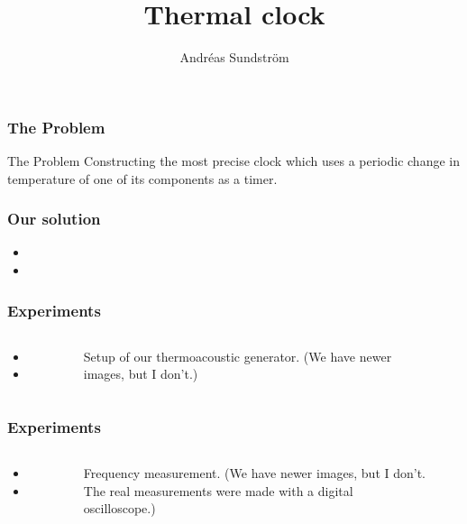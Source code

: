 \documentclass{beamer}
\title[Thermal clock]{Thermal clock} %
\author[]{Andréas Sundström}
\date{\vspace{-0.25cm}}
\institute[Chalmers]{\RBox{\large Chalmers University of Technology}}
\begin{document}

\begin{frame}[plain]

\linethickness{0.075mm}

  \titlepage
\end{frame}


\begin{frame}
\frametitle{The Problem}
 \begin{block}{\centering The Problem}\centering
Constructing the most precise clock which uses a periodic change in
temperature of one of its components as a timer. 
 \end{block}
\end{frame}

\begin{frame}
 \frametitle{Our solution}
 \begin{itemize}
  \item 
  \item 
 \end{itemize}
\end{frame}


\begin{frame}
 \frametitle{Experiments}
 \begin{columns}[c]
 \begin{itemize}
  \item 
  \item
 \end{itemize}
\begin{figure}
\caption{Setup of our thermoacoustic generator. (We have newer images,
but I don't.)}
\end{figure}
\end{columns}
\end{frame}


\begin{frame}
 \frametitle{Experiments}
 \begin{columns}[c]
 \begin{itemize}
  \item 
  \item 
 \end{itemize}
\begin{figure}
\caption{Frequency measurement. (We have newer images,
but I don't. The real measurements were made with a digital oscilloscope.)}
\end{figure}
\end{columns}
\end{frame}


\end{document}
